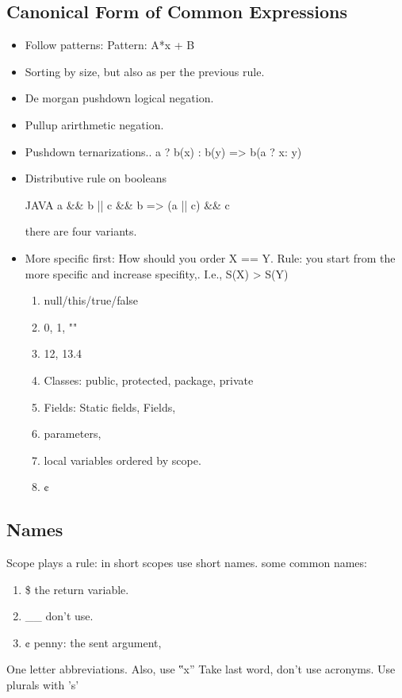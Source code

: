 \subsection{Canonical Form of Common Expressions}
\begin{itemize}
  \item Follow patterns: Pattern: A*x + B
  \item Sorting by size, but also as per the previous rule.
  \item De morgan pushdown logical negation.
  \item Pullup arirthmetic negation.
  \item Pushdown ternarizations..
        a ? b(x) : b(y) => b(a ? x: y)
  \item Distributive rule on booleans
    \begin{code}{JAVA}
a && b || c && b => (a || c) && c
    \end{code}
      there are four variants.
  \item More specific first: How should you order X == Y.
        Rule: you start from the more specific and increase specifity,.
        I.e., S(X) > S(Y)

        \begin{enumerate}
          \item null/this/true/false
          \item 0, 1, ""
          \item 12, 13.4
          \item Classes: public, protected, package, private
          \item Fields: Static fields, Fields,
          \item parameters,
          \item local variables ordered by scope.
          \item ¢
        \end{enumerate}
\end{itemize}

\subsection{Names}
Scope plays a rule:
in short scopes use short names.
some common names:
\begin{enumerate}
  \item \$ the return variable.
  \item \_\_ don't use.
  \item ¢ penny: the sent argument,
\end{enumerate}
One letter abbreviations.
Also, use ‟x”
Take last word, don't use acronyms.
Use plurals with 's'

